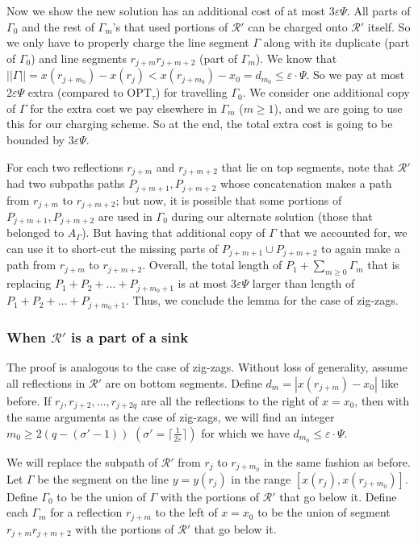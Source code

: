 \documentclass[pdflatex,sn-mathphys-num]{sn-jnl}
\theoremstyle{thmstyleone}
\newcommand{\eps}{\varepsilon}
\newcommand{\OPT}{{\text{OPT}}}
\newcommand{\norm}[1]{|| #1 ||}
\newcommand{\abs}[1]{\left.|#1|\right.}
\begin{document}
        Now we show the new solution has an additional cost of at most $3\eps\Psi$. All parts of $\Gamma_0$ and the rest of $\Gamma_m$'s that used portions of $\mathcal R'$ can be charged onto $\mathcal R'$ itself. So we only have to properly charge the line segment $\Gamma$ along with its duplicate (part of $\Gamma_0$) and line segments $r_{j + m}r_{j + m + 2}$ (part of $\Gamma_m$). We know that $\norm \Gamma = x(r_{j + m_0}) - x(r_{j}) < x(r_{j + m_0}) - x_0 = d_{m_0} \le \eps\cdot\Psi$. So we pay at most $2\eps\Psi$ extra (compared to $\OPT_\tau$) for travelling $\Gamma_0$. We consider one additional copy of $\Gamma$ for the extra cost we pay elsewhere in $\Gamma_m$ ($m\geq 1$), and we are going to use this for our charging scheme. So at the end, the total extra cost is going to be bounded by $3\eps\Psi$.
        
        For each two reflections $r_{j + m}$ and $r_{j + m + 2}$ that lie on top segments, note that $\mathcal R'$ had
        two subpaths paths $P_{j+m + 1},P_{j+m + 2}$ whose concatenation makes a path from $r_{j+m}$ to $r_{j+m+2}$; but now, it is possible that some portions of $P_{j+m+1},P_{j+m + 2}$ are used in $\Gamma_0$ during our alternate solution (those that belonged to $A_\Gamma$). But having that additional copy of $\Gamma$ that we accounted for, we can use it to short-cut the missing parts of $P_{j+m + 1}\cup P_{j+m + 2}$ to again make a path from $r_{j + m}$ to $r_{j + m + 2}$. Overall, the total length of $P_1+\sum_{m\geq 0} \Gamma_m$ that is replacing $P_1+P_2+\ldots+P_{j+m_0+1}$ is at most $3\eps\Psi$ larger than length of $P_1+P_2+\ldots+P_{j+m_0+1}$.
        Thus, we conclude the lemma for the case of zig-zags.
        

\subsubsection*{When $\mathcal R'$ is a part of a sink}
    The proof is analogous to the case of zig-zags. Without loss of generality, assume all reflections in $\mathcal R'$ are on bottom segments. Define $d_{m} = \abs{x(r_{j + m}) - x_0}$ like before. If $r_{j}, r_{j+2},\dots, r_{j + 2q}$ are all the reflections to the right of $ x = x_0 $, then with the same arguments as the case of zig-zags, we will find an integer $m_0 \ge 2(q - (\sigma' -1))$ $(\sigma' = \lceil \frac{1}{2\eps}\rceil)$ for which we have $d_{m_0} \le \eps\cdot\Psi$. 
    
    We will replace the subpath of $\mathcal R'$ from $r_j$ to $r_{j + m_0}$ in the same fashion as before. Let $\Gamma$ be the segment on the line $y = y(r_j)$ in the range $[x(r_j),\left. x(r_{j + m_0}) \right.]$. Define $\Gamma_0$ to be the union of $\Gamma$ with the portions of $\mathcal R'$ that go below it. Define each $\Gamma_m$ for a reflection $r_{j + m}$ to the left of $x = x_0$ to be the union of segment $r_{j+m}\left. r_{j + m + 2}\right.$ with the portions of $\mathcal R'$ that go below it.
\end{document}
